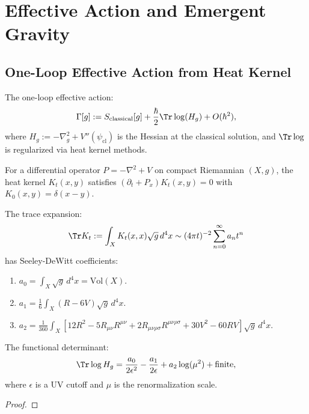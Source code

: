 


\section{Effective Action and Emergent Gravity}
\label{sec:effectiveActionGravity}
\label{sec:effectiveAction}




\subsection{One-Loop Effective Action from Heat Kernel}
\label{subsec:oneLoopEffectiveActionFromHeatKernel}

\begin{definition}
\label{def:effectiveAction}
The one-loop effective action:
\begin{equation}
\Gamma[g] := S_{\text{classical}}[g] + \frac{\hbar}{2} \Tr \log(H_g) + O(\hbar^2),
\end{equation}
where $H_g := -\nabla_g^2 + V''(\psi_{\text{cl}})$ is the Hessian at the classical solution, and $\Tr \log$ is regularized via heat kernel methods.
\end{definition}

\begin{theorem}
\label{thm:seeleyDewitt}
For a differential operator $P = -\nabla^2 + V$ on compact Riemannian $(X, g)$, the heat kernel $K_t(x, y)$ satisfies $(\partial_t + P_x) K_t(x, y) = 0$ with $K_0(x, y) = \delta(x - y)$.

The trace expansion:
\begin{equation}
\Tr K_t := \int_X K_t(x, x) \sqrt{g} \, d^4x \sim (4\pi t)^{-2} \sum_{n=0}^\infty a_n t^n
\end{equation}
has Seeley-DeWitt coefficients:

\begin{enumerate}
\item $a_0 = \int_X \sqrt{g} \, d^4x = \text{Vol}(X)$.

\item $a_1 = \frac{1}{6} \int_X (R - 6V) \sqrt{g} \, d^4x$.

\item $a_2 = \frac{1}{360} \int_X [12R^2 - 5R_{\mu\nu}R^{\mu\nu} + 2R_{\mu\nu\rho\sigma}R^{\mu\nu\rho\sigma} + 30V^2 - 60RV] \sqrt{g} \, d^4x$.
\end{enumerate}

The functional determinant:
\begin{equation}
\Tr \log H_g = \frac{a_0}{2\epsilon^2} - \frac{a_1}{2\epsilon} + a_2 \log(\mu^2) + \text{finite},
\end{equation}
where $\epsilon$ is a UV cutoff and $\mu$ is the renormalization scale.

\begin{proof}

\end{proof}
\end{theorem}


